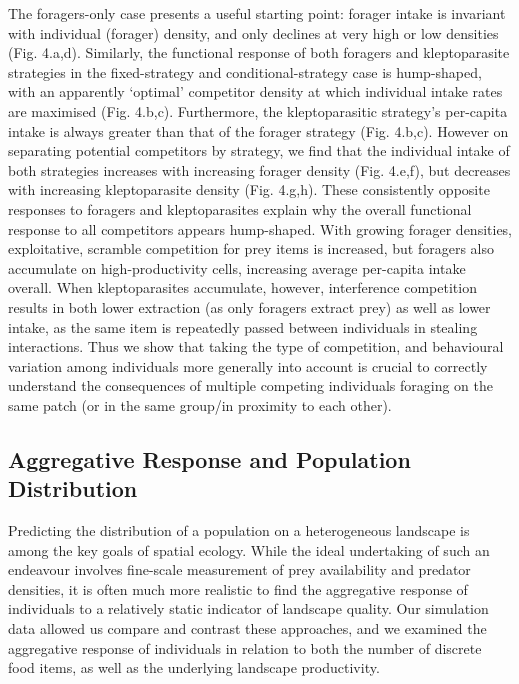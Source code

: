 \documentclass[11pt]{article}
\begin{document}
The foragers-only case presents a useful starting point: forager intake is invariant with individual (forager) density, and only declines at very high or low densities (Fig. 4.a,d).
Similarly, the functional response of both foragers and kleptoparasite strategies in the fixed-strategy and conditional-strategy case is hump-shaped, with an apparently `optimal' competitor density at which individual intake rates are maximised (Fig. 4.b,c).
Furthermore, the kleptoparasitic strategy's per-capita intake is always greater than that of the forager strategy (Fig. 4.b,c).
However on separating potential competitors by strategy, we find that the individual intake of both strategies increases with increasing forager density (Fig. 4.e,f), but decreases with increasing kleptoparasite density (Fig. 4.g,h).
These consistently opposite responses to foragers and kleptoparasites explain why the overall functional response to all competitors appears hump-shaped.
With growing forager densities, exploitative, scramble competition for prey items is increased, but foragers also accumulate on high-productivity cells, increasing average per-capita intake overall.
When kleptoparasites accumulate, however, interference competition results in both lower extraction (as only foragers extract prey) as well as lower intake, as the same item is repeatedly passed between individuals in stealing interactions.
Thus we show that taking the type of competition, and behavioural variation among individuals more generally into account is crucial to correctly understand the consequences of multiple competing individuals foraging on the same patch (or in the same group/in proximity to each other).

\subsection{Aggregative Response and Population Distribution}

Predicting the distribution of a population on a heterogeneous landscape is among the key goals of spatial ecology.
While the ideal undertaking of such an endeavour involves fine-scale measurement of prey availability and predator densities, it is often much more realistic to find the aggregative response of individuals to a relatively static indicator of landscape quality.
Our simulation data allowed us compare and contrast these approaches, and we examined the aggregative response of individuals in relation to both the number of discrete food items, as well as the underlying landscape productivity.
\end{document}
